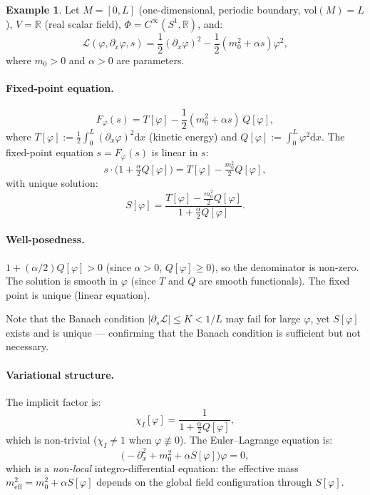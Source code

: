 \documentclass[12pt,letterpaper]{article}
\theoremstyle{definition}
\newtheorem{example}[theorem]{Example}
\newcommand{\mL}{\mathcal{L}}
\newcommand{\mPhi}{\Phi}
\newcommand{\vol}{\mathrm{vol}}
\newcommand{\R}{\mathbb{R}}
\newcommand{\diff}{\mathrm{d}}
\begin{document}
\begin{example}
\label{ex:toy}
Let $M = [0, L]$ (one-dimensional, periodic boundary, $\vol(M) = L$), $V = \R$ (real scalar field), $\mPhi = C^\infty(S^1, \R)$, and:
\begin{equation}
\mL(\varphi, \partial_x\varphi, s) = \frac{1}{2}(\partial_x\varphi)^2 - \frac{1}{2}(m_0^2 + \alpha s)\varphi^2,
\label{eq:toy-L}
\end{equation}
where $m_0 > 0$ and $\alpha > 0$ are parameters.

\paragraph{Fixed-point equation.}
\[ F_\varphi(s) = T[\varphi] - \frac{1}{2}(m_0^2 + \alpha s)\, Q[\varphi], \]
where $T[\varphi] := \frac{1}{2}\int_0^L (\partial_x\varphi)^2 \diff x$ (kinetic energy) and $Q[\varphi] := \int_0^L \varphi^2 \diff x$. The fixed-point equation $s = F_\varphi(s)$ is linear in $s$:
\[ s \cdot \bigl(1 + \tfrac{\alpha}{2} Q[\varphi]\bigr) = T[\varphi] - \tfrac{m_0^2}{2} Q[\varphi], \]
with unique solution:
\begin{equation}
S[\varphi] = \frac{T[\varphi] - \frac{m_0^2}{2} Q[\varphi]}{1 + \frac{\alpha}{2} Q[\varphi]}.
\label{eq:toy-solution}
\end{equation}

\paragraph{Well-posedness.}
$1 + (\alpha/2) Q[\varphi] > 0$ (since $\alpha > 0$, $Q[\varphi] \geq 0$), so the denominator is non-zero. The solution is smooth in $\varphi$ (since $T$ and $Q$ are smooth functionals). The fixed point is unique (linear equation).

Note that the Banach condition $|\partial_s \mL| \leq K < 1/L$ may fail for large $\varphi$, yet $S[\varphi]$ exists and is unique --- confirming that the Banach condition is sufficient but not necessary.

\paragraph{Variational structure.}
The implicit factor is:
\[ \chi_I[\varphi] = \frac{1}{1 + \frac{\alpha}{2} Q[\varphi]}, \]
which is non-trivial ($\chi_I \neq 1$ when $\varphi \not\equiv 0$). The Euler--Lagrange equation is:
\[ \bigl(-\partial_x^2 + m_0^2 + \alpha S[\varphi]\bigr)\varphi = 0, \]
which is a \emph{non-local} integro-differential equation: the effective mass $m_{\mathrm{eff}}^2 = m_0^2 + \alpha S[\varphi]$ depends on the global field configuration through $S[\varphi]$.


\end{example}
\end{document}

